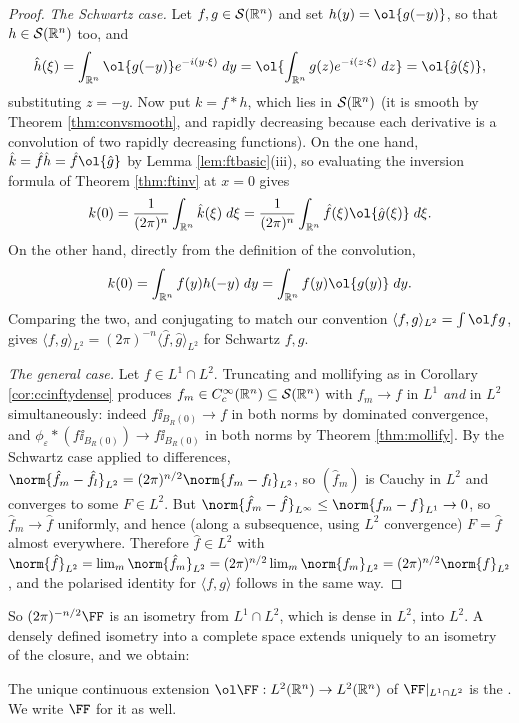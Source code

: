 \documentclass[a4paper]{scrartcl}
\newcommand{\ip}[2]{\langle #1, #2 \rangle}
\newcommand{\Sch}{\mathcal{S}}
\begin{document}
\begin{proof}
	\emph{The Schwartz case.} Let $f, g \in \Sch(\R^n)$ and set $h(y) = \ol{g(-y)}$, so that $h \in \Sch(\R^n)$ too, and
	$$\hat h(\xi)=\int_{\R^n}\ol{g(-y)}e^{-i(y\cdot\xi)}\dd y = \ol{\int_{\R^n}g(z)e^{-i(z\cdot\xi)}\dd z}=\ol{\hat g(\xi)},$$
	substituting $z = -y$. Now put $k = f * h$, which lies in $\Sch(\R^n)$ (it is smooth by Theorem \ref{thm:convsmooth}, and rapidly decreasing because each derivative is a convolution of two rapidly decreasing functions). On the one hand, $\hat k = \hat f\hat h = \hat f \ol{\hat g}$ by Lemma \ref{lem:ftbasic}(iii), so evaluating the inversion formula of Theorem \ref{thm:ftinv} at $x = 0$ gives
	$$k(0) = \frac{1}{(2\pi)^n}\int_{\R^n}\hat k(\xi)\dd\xi = \frac{1}{(2\pi)^n}\int_{\R^n}\hat f(\xi)\ol{\hat g(\xi)}\dd\xi.$$
	On the other hand, directly from the definition of the convolution,
	$$k(0)=\int_{\R^n}f(y)h(-y)\dd y = \int_{\R^n}f(y)\ol{g(y)}\dd y.$$
	Comparing the two, and conjugating to match our convention $\ip{f}{g}_{L^2}=\int\ol fg$, gives $\ip{f}{g}_{L^2}=(2\pi)^{-n}\ip{\hat f}{\hat g}_{L^2}$ for Schwartz $f, g$.

	\emph{The general case.} Let $f \in L^1 \cap L^2$. Truncating and mollifying as in Corollary \ref{cor:ccinftydense} produces $f_m \in C_c^\infty(\R^n)\subseteq\Sch(\R^n)$ with $f_m \to f$ in $L^1$ \emph{and} in $L^2$ simultaneously: indeed $f\ii_{B_R(0)}\to f$ in both norms by dominated convergence, and $\phi_\varepsilon * (f \ii_{B_R(0)})\to f\ii_{B_R(0)}$ in both norms by Theorem \ref{thm:mollify}. By the Schwartz case applied to differences, $\norm{\hat f_m - \hat f_l}_{L^2}=(2\pi)^{n/2}\norm{f_m-f_l}_{L^2}$, so $(\hat f_m)$ is Cauchy in $L^2$ and converges to some $F \in L^2$. But $\norm{\hat f_m - \hat f}_{L^\infty}\le\norm{f_m-f}_{L^1}\to 0$, so $\hat f_m \to \hat f$ uniformly, and hence (along a subsequence, using $L^2$ convergence) $F = \hat f$ almost everywhere. Therefore $\hat f \in L^2$ with $\norm{\hat f}_{L^2}=\lim_m\norm{\hat f_m}_{L^2}=(2\pi)^{n/2}\lim_m\norm{f_m}_{L^2}=(2\pi)^{n/2}\norm{f}_{L^2}$, and the polarised identity for $\ip{f}{g}$ follows in the same way.
\end{proof}

So $(2\pi)^{-n/2}\FF$ is an isometry from $L^1 \cap L^2$, which is dense in $L^2$, into $L^2$. A densely defined isometry into a complete space extends uniquely to an isometry of the closure, and we obtain:

\begin{definition}
	The unique continuous extension $\ol\FF : L^2(\R^n)\to L^2(\R^n)$ of $\FF|_{L^1 \cap L^2}$ is the . We write $\FF$ for it as well.
\end{definition}
\end{document}
